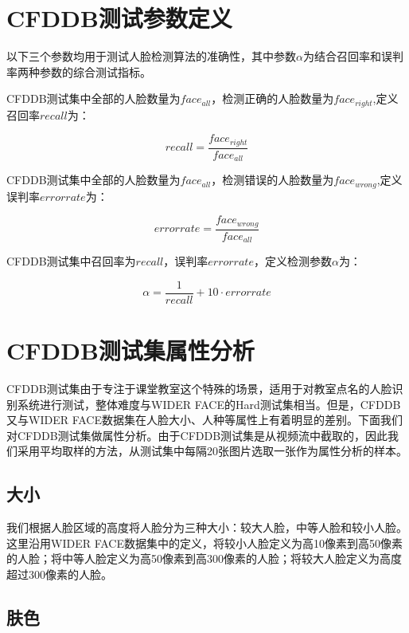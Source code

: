\section{CFDDB测试参数定义}

以下三个参数均用于测试人脸检测算法的准确性，其中参数$\alpha$为结合召回率和误判率两种参数的综合测试指标。

CFDDB测试集中全部的人脸数量为$face_{all}$，检测正确的人脸数量为$face_{right}$,定义召回率$recall$为：

\begin{equation}
\label{eq:rdef}
recall = \frac{face_{right}}{face_{all}} 
\end{equation}

CFDDB测试集中全部的人脸数量为$face_{all}$，检测错误的人脸数量为$face_{wrong}$,定义误判率$errorrate$为：

\begin{equation}
\label{eq:edef}
errorrate = \frac{face_{wrong}}{face_{all}} 
\end{equation}

CFDDB测试集中召回率为$recall$，误判率$errorrate$，定义检测参数$\alpha$为：

\begin{equation}
\label{eq:alphadef}
\alpha = \frac{1}{recall} + 10\cdot errorrate
\end{equation}

\section{CFDDB测试集属性分析}

CFDDB测试集由于专注于课堂教室这个特殊的场景，适用于对教室点名的人脸识别系统进行测试，整体难度与WIDER FACE\cite{yang2016wider}的Hard测试集相当。但是，CFDDB又与WIDER FACE数据集在人脸大小、人种等属性上有着明显的差别。下面我们对CFDDB测试集做属性分析。由于CFDDB测试集是从视频流中截取的，因此我们采用平均取样的方法，从测试集中每隔20张图片选取一张作为属性分析的样本。

\subsection{大小}

我们根据人脸区域的高度将人脸分为三种大小：较大人脸，中等人脸和较小人脸。这里沿用WIDER FACE数据集中的定义，将较小人脸定义为高10像素到高50像素的人脸；将中等人脸定义为高50像素到高300像素的人脸；将较大人脸定义为高度超过300像素的人脸。

\subsection{肤色}

